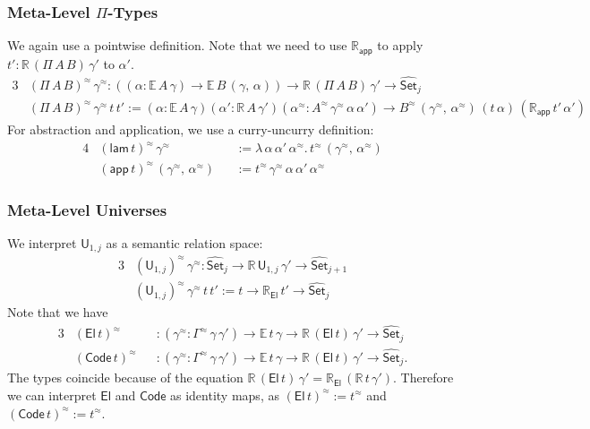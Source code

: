 \documentclass[acmsmall,screen]{acmart}
\newcommand{\msf}[1]{\mathsf{#1}}
\newcommand{\mbb}[1]{\mathbb{#1}}
\newcommand{\wh}[1]{\widehat{#1}}
\newcommand{\Code}{\msf{Code}}
\newcommand{\El}{\msf{El}}
\newcommand{\lam}{\msf{lam}}
\newcommand{\app}{\msf{app}}
\newcommand{\U}{\msf{U}}
\newcommand{\Set}{\mathsf{Set}}
\newcommand{\ev}{\mbb{E}}
\newcommand{\re}{\mbb{R}}
\theoremstyle{remark}
\newcommand{\whset}{\wh{\Set}}
\newcommand{\rel}{^{\approx}}
\begin{document}
\subsubsection{Meta-Level $\Pi$-Types} We again use a pointwise definition. Note that we need to use
$\re_{\app}$ to apply $t' : \re\,(\Pi\,A\,B)\,\gamma'$ to $\alpha'$.
\begin{alignat*}{3}
  &(\Pi\,A\,B)\rel\,\gamma\rel : ((\alpha : \ev\,A\,\gamma) \to \ev\,B\,(\gamma,\,\alpha))
             \to \re\,(\Pi\,A\,B)\,\gamma' \to \whset_j\\
  &(\Pi\,A\,B)\rel\,\gamma\rel\,t\,t' :=
    (\alpha : \ev\,A\,\gamma)(\alpha' : \re\,A\,\gamma')(\alpha\rel : A\rel\,\gamma\rel\,\alpha\,\alpha') \to
    B\rel\,(\gamma\rel,\,\alpha\rel)\,(t\,\alpha)\,(\re_{\app}\,t'\,\alpha')
\end{alignat*}
For abstraction and application, we use a curry-uncurry definition:
\begin{alignat*}{4}
  &(\lam\,t)\rel\,\gamma\rel                &&:= \lambda\,\alpha\,\alpha'\,\alpha\rel.\,t\rel\,(\gamma\rel,\,\alpha\rel)\\
  &(\app\,t)\rel\,(\gamma\rel,\,\alpha\rel) &&:= t\rel\,\gamma\rel\,\alpha\,\alpha'\,\alpha\rel
\end{alignat*}

\subsubsection{Meta-Level Universes} We interpret $\U_{1,j}$ as a semantic relation space:
\begin{alignat*}{3}
  &(\U_{1,j})\rel\,\gamma\rel : \whset_j \to \re\,\U_{1,j}\,\gamma' \to \whset_{j+1} \\
  &(\U_{1,j})\rel\,\gamma\rel\,t\,t' := t \to \re_{\El}\,t' \to \whset_{j}
\end{alignat*}
Note that we have
\begin{alignat*}{3}
  & (\El\,t)\rel   &&: (\gamma\rel : \Gamma\rel\,\gamma\,\gamma') \to \ev\,t\,\gamma \to \re\,(\El\,t)\,\gamma' \to \whset_j\\
  & (\Code\,t)\rel &&: (\gamma\rel : \Gamma\rel\,\gamma\,\gamma') \to \ev\,t\,\gamma \to \re\,(\El\,t)\,\gamma' \to \whset_j.
\end{alignat*}
The types coincide because of the equation $\re\,(\El\,t)\,\gamma' =
\re_{\El}\,(\re\,t\,\gamma')$. Therefore we can interpret $\El$ and $\Code$ as
identity maps, as $(\El\,t)\rel := t\rel$ and $(\Code\,t)\rel := t\rel$.
\end{document}
